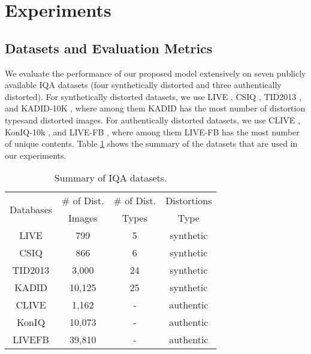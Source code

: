 \documentclass[10pt,twocolumn,letterpaper]{article}
\begin{document}
\section{Experiments}
\subsection{Datasets and  Evaluation Metrics}
We evaluate the performance of our proposed model extensively on seven publicly available IQA datasets (four synthetically distorted and three authentically distorted).
For synthetically distorted datasets, we use LIVE \cite{sheikh2006statistical}, CSIQ \cite{larson2010most}, TID2013 \cite{ponomarenko2015image}, and KADID-10K \cite{lin2019kadid}, where among them  KADID  has the most number of distortion typesand  distorted images.
For authentically distorted datasets, we use CLIVE \cite{ghadiyaram2015massive},  KonIQ-10k \cite{hosu2020koniq}, and LIVE-FB \cite{ying2019patches}, where among them LIVE-FB has the most number of unique contents.
Table \ref{TB0} shows the summary of the datasets that are used in our experiments.


\begin{table}[h!]
\centering
\caption{Summary of IQA datasets.}
\resizebox{2.1 in}{!} {
\begin{tabular}{cccc}
\hline 
\multirow{2}{*}{Databases} & \# of Dist. & \# of Dist.  & Distortions \tabularnewline
 & Images & Types & Type\tabularnewline
\hline 
LIVE & 799 & 5 & synthetic\tabularnewline
CSIQ & 866 & 6 & synthetic\tabularnewline
TID2013 & 3,000 & 24 & synthetic\tabularnewline
KADID & 10,125 & 25 & synthetic\tabularnewline
CLIVE & 1,162 & - & authentic\tabularnewline
KonIQ & 10,073 & - & authentic\tabularnewline
LIVEFB & 39,810 & - & authentic\tabularnewline
\hline 
\end{tabular}
}
\label{TB0}

\end{table}
\end{document}
